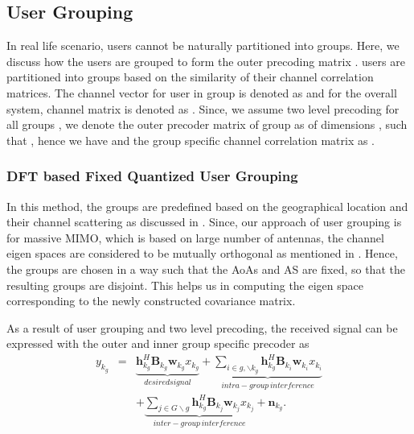 \documentclass{article}
\begin{document}
\subsection{User Grouping}
\label{usr_grp}

In real life scenario, users cannot be naturally partitioned into groups. Here, we discuss how the users are grouped to form the outer precoding matrix .  users are partitioned into  groups based on the similarity of their channel correlation matrices. The channel vector for  user in group  is denoted as  and for the overall  system, channel matrix is denoted as . Since, we assume two level precoding for all groups , we denote the outer precoder matrix of group  as  of dimensions , such that , hence we have  and the group specific channel correlation matrix as .
\vspace{-1eM}
\subsubsection{DFT based Fixed Quantized User Grouping}
\label{usr_grp2}
In this method, the groups are predefined based on the geographical location and their channel scattering as discussed in \cite{nam2014joint}. Since, our approach of user grouping is for massive \ac{MIMO}, which is based on large number of antennas, the channel eigen spaces are considered to be mutually orthogonal as mentioned in \cite{adhikary2013joint}. Hence, the groups are chosen in a way such that the \ac{AoA}s  and \ac{AS} are fixed, so that the resulting groups are disjoint. This helps us in computing the eigen space corresponding to the newly constructed covariance matrix.  %

As  a result of user grouping and two level precoding, the received signal can be expressed with the outer and inner group specific precoder as 
\begin{eqnarray} \label{icassp4}
{y}_{k_g} &=& \underbrace{\mathbf{h}_{k_g}^H \mathbf{B}_{k_g} \mathbf{w}_{k_g} x_{k_g}}_{desired signal} + \underbrace{\sum_{i \in g,\backslash k_g} \mathbf{h}_{k_g}^H \mathbf{B}_{k_i} \mathbf{w}_{k_i} x_{k_i}}_{intra-group \, interference}\nonumber \\  &&+ \underbrace{\sum_{j \in G \backslash g} \mathbf{h}_{k_g}^H \mathbf{B}_{k_j} \mathbf{w}_{k_j} x_{k_j}}_{inter-group \, interference} + \mathbf{n}_{k_g}.
\end{eqnarray}  
\end{document}
